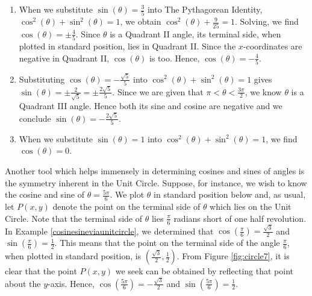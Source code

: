 {
\begin{enumerate} \item  When we substitute $\sin(\theta) = \frac{3}{5}$ into The Pythagorean Identity, $\cos^{2}(\theta) + \sin^{2}(\theta) = 1$, we obtain $\cos^{2}(\theta) + \frac{9}{25} = 1$.  Solving, we find $\cos(\theta) = \pm \frac{4}{5}$.  Since $\theta$ is a Quadrant II angle, its terminal side, when plotted in standard position, lies in Quadrant II.  Since the $x$-coordinates are negative in Quadrant II, $\cos(\theta)$ is too.  Hence, $\cos(\theta) = - \frac{4}{5}$.

\item Substituting $\cos(\theta) = -\frac{\sqrt{5}}{5}$ into $\cos^{2}(\theta) + \sin^{2}(\theta) = 1$ gives $\sin(\theta) = \pm \frac{2}{\sqrt{5}} = \pm \frac{2 \sqrt{5}}{5}$.  Since we are given that $\pi < \theta < \frac{3\pi}{2}$, we know $\theta$ is a Quadrant III angle. Hence both its sine and cosine are negative and we conclude $\sin(\theta) = -\frac{2 \sqrt{5}}{5}$.

\item  When we substitute $\sin(\theta) = 1$ into $\cos^{2}(\theta) + \sin^{2}(\theta) = 1$, we find $\cos(\theta) = 0$. 

\end{enumerate}
}

\medskip

Another tool which helps immensely in determining cosines and sines of angles is the symmetry inherent in the Unit Circle.  Suppose, for instance, we wish to know the cosine and sine of  $\theta = \frac{5 \pi}{6}$. We plot $\theta$ in standard position below and, as usual, let $P(x,y)$ denote the point on the terminal side of $\theta$ which lies on the Unit Circle.  Note that the terminal side of $\theta$ lies $\frac{\pi}{6}$ radians short of one half revolution.  In Example \ref{cosinesineviaunitcircle}, we determined that $\cos\left(\frac{\pi}{6}\right) = \frac{\sqrt{3}}{2}$ and $\sin\left( \frac{\pi}{6} \right) = \frac{1}{2}$.   This means that the point on the terminal side of the angle $\frac{\pi}{6}$, when plotted in standard position, is $\left(\frac{\sqrt{3}}{2}, \frac{1}{2}\right)$.  From Figure \ref{fig:circle7}, it is clear that the point $P(x,y)$ we seek can be obtained by reflecting that point about the $y$-axis.  Hence,  $\cos\left(\frac{5\pi}{6}\right) = -\frac{\sqrt{3}}{2}$ and $\sin\left( \frac{5\pi}{6} \right) = \frac{1}{2}$. 

